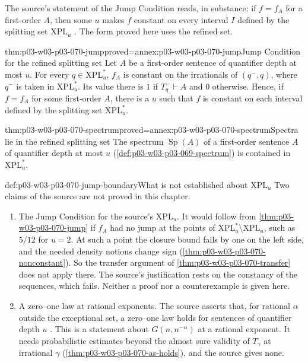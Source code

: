 The source's statement of the Jump Condition reads, in substance: if
\(f=f_A\) for a first-order \(A\), then some \(u\) makes \(f\) constant on
every interval \(I\) defined by the splitting set \(\mathrm{XPL}_u\)
\cite[p.~19]{Spencer2007LogicRandomStructuresAuthor}.  The form proved here
uses the refined set.

\begin{hbtheorem}{thm:p03-w03-p03-070-jump}{proved=annex:p03-w03-p03-070-jump}{Jump Condition for the refined splitting set}
Let \(A\) be a first-order sentence of quantifier depth at most \(u\).  For
every \(q\in\mathrm{XPL}^\ast_u\), \(f_A\) is constant on the irrationals of
\((q^-,q)\), where \(q^-\) is taken in \(\mathrm{XPL}^\ast_u\).  Its value
there is \(1\) if \(T^-_q\vdash A\) and \(0\) otherwise.  Hence, if
\(f=f_A\) for some first-order \(A\), there is a \(u\) such that \(f\) is
constant on each interval defined by the splitting set
\(\mathrm{XPL}^\ast_u\).
\end{hbtheorem}

\begin{hbcorollary}{thm:p03-w03-p03-070-spectrum}{proved=annex:p03-w03-p03-070-spectrum}{Spectra lie in the refined splitting set}
The spectrum \(\operatorname{Sp}(A)\) of a first-order sentence \(A\) of quantifier depth at most
\(u\) (\cref{def:p03-w03-p03-069-spectrum}) is contained in
\(\mathrm{XPL}^\ast_u\).
\end{hbcorollary}

\begin{proofboundary}{def:p03-w03-p03-070-jump-boundary}{What is not established about \(\mathrm{XPL}_u\)}
Two claims of the source are not proved in this chapter.
\begin{enumerate}
\item The Jump Condition for the source's \(\mathrm{XPL}_u\).  It would follow
      from \cref{thm:p03-w03-p03-070-jump} if \(f_A\) had no jump at the
      points of \(\mathrm{XPL}^\ast_u\setminus\mathrm{XPL}_u\), such as
      \(5/12\) for \(u=2\).  At such a point the closure bound fails by one
      on the left side, and the needed density notions change sign
      (\cref{thm:p03-w03-p03-070-nonconstant}).  So the transfer argument of
      \cref{thm:p03-w03-p03-070-transfer} does not apply there.  The source's
      justification rests on the constancy of the sequences, which fails.
      Neither a proof nor a counterexample is given here.
\item A zero--one law at rational exponents.  The source asserts that, for
      rational \(\alpha\) outside the exceptional set, a zero--one law holds
      for sentences of quantifier depth \(u\)
      \cite[p.~19]{Spencer2007LogicRandomStructuresAuthor}.  This is a
      statement about \(G(n,n^{-\alpha})\) at a rational exponent.  It needs
      probabilistic estimates beyond the almost sure validity of
      \(T_\gamma\) at irrational \(\gamma\)
      (\cref{thm:p03-w03-p03-070-as-holds}), and the source gives none.
\end{enumerate}
\end{proofboundary}

